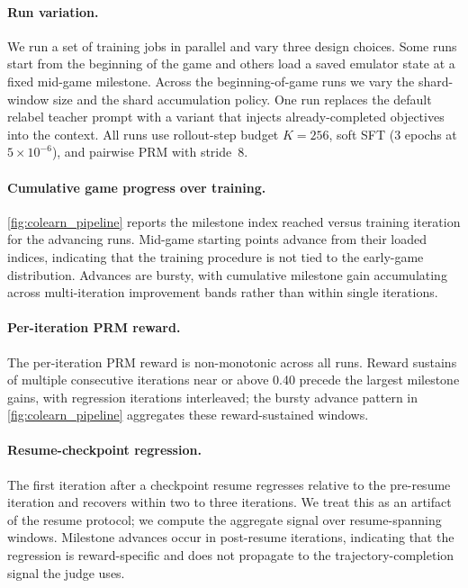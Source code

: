 \paragraph{Run variation.} We run a set of training jobs in parallel and vary three design choices. Some runs start from the beginning of the game and others load a saved emulator state at a fixed mid-game milestone. Across the beginning-of-game runs we vary the shard-window size and the shard accumulation policy. One run replaces the default relabel teacher prompt with a variant that injects already-completed objectives into the context. All runs use rollout-step budget $K{=}256$, soft SFT (3 epochs at $5{\times}10^{-6}$), and pairwise PRM with stride~8.

\paragraph{Cumulative game progress over training.} \cref{fig:colearn_pipeline} reports the milestone index reached versus training iteration for the advancing runs. Mid-game starting points advance from their loaded indices, indicating that the training procedure is not tied to the early-game distribution. Advances are bursty, with cumulative milestone gain accumulating across multi-iteration improvement bands rather than within single iterations.

\paragraph{Per-iteration PRM reward.} The per-iteration PRM reward is non-monotonic across all runs. Reward sustains of multiple consecutive iterations near or above 0.40 precede the largest milestone gains, with regression iterations interleaved; the bursty advance pattern in \cref{fig:colearn_pipeline} aggregates these reward-sustained windows.

\paragraph{Resume-checkpoint regression.} The first iteration after a checkpoint resume regresses relative to the pre-resume iteration and recovers within two to three iterations. We treat this as an artifact of the resume protocol; we compute the aggregate signal over resume-spanning windows. Milestone advances occur in post-resume iterations, indicating that the regression is reward-specific and does not propagate to the trajectory-completion signal the judge uses.
